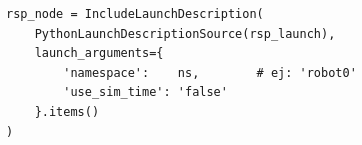 \begin{figure}[t]
\centering
\begin{lstlisting}[style=python,
    caption={Inclusión de rsp.launch.py con argumentos.},
    label={lst:include_rsp}]
rsp_node = IncludeLaunchDescription(
    PythonLaunchDescriptionSource(rsp_launch),
    launch_arguments={
        'namespace':    ns,        # ej: 'robot0'
        'use_sim_time': 'false'
    }.items()
)
\end{lstlisting}
\end{figure}
